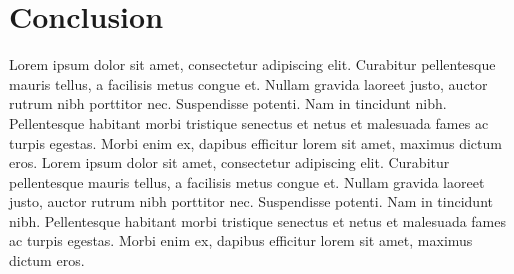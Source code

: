\documentclass[conference, 12pt]{IEEEtran}
\begin{document}
\section{Conclusion}
Lorem ipsum dolor sit amet, consectetur adipiscing elit. Curabitur pellentesque mauris tellus, a facilisis metus congue et. Nullam gravida laoreet justo, auctor rutrum nibh porttitor nec. Suspendisse potenti. Nam in tincidunt nibh. Pellentesque habitant morbi tristique senectus et netus et malesuada fames ac turpis egestas. Morbi enim ex, dapibus efficitur lorem sit amet, maximus dictum eros. Lorem ipsum dolor sit amet, consectetur adipiscing elit. Curabitur pellentesque mauris tellus, a facilisis metus congue et. Nullam gravida laoreet justo, auctor rutrum nibh porttitor nec. Suspendisse potenti. Nam in tincidunt nibh. Pellentesque habitant morbi tristique senectus et netus et malesuada fames ac turpis egestas. Morbi enim ex, dapibus efficitur lorem sit amet, maximus dictum eros. 
\end{document}
